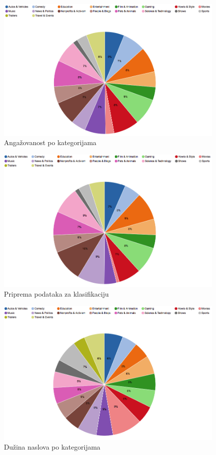 \documentclass[a4paper]{article}
\theoremstyle{definition}
\begin{document}
\begin{figure}[h!]
\begin{center}
    \includegraphics[width=1\textwidth]{categories_engagement.png}
    \caption{Angažovanost po kategorijama}
\end{center}
\end{figure}

\begin{figure}[h!]
\begin{center}
    \includegraphics[width=1\textwidth]{categories_perc-title.png}
    \caption{Priprema podataka za klasifikaciju}
\end{center}
\end{figure}

\begin{figure}[h!]
\begin{center}
    \includegraphics[width=1\textwidth]{categories_title.png}
    \caption{Dužina naslova po kategorijama}
\end{center}
\end{figure}
\end{document}
